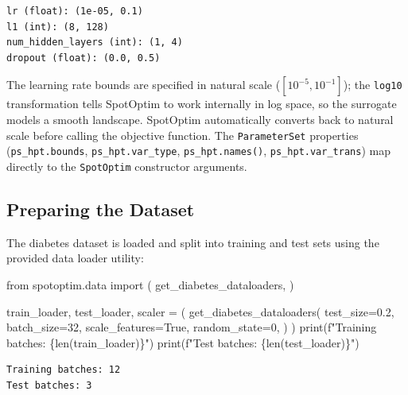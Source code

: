 \documentclass[
  twocolumn]{article}
\newenvironment{Shaded}{\begin{snugshade}}{\end{snugshade}}
\newcommand{\BuiltInTok}[1]{\textcolor[rgb]{0.00,0.23,0.31}{#1}}
\newcommand{\DecValTok}[1]{\textcolor[rgb]{0.68,0.00,0.00}{#1}}
\newcommand{\FloatTok}[1]{\textcolor[rgb]{0.68,0.00,0.00}{#1}}
\newcommand{\ImportTok}[1]{\textcolor[rgb]{0.00,0.46,0.62}{#1}}
\newcommand{\NormalTok}[1]{\textcolor[rgb]{0.00,0.23,0.31}{#1}}
\newcommand{\OperatorTok}[1]{\textcolor[rgb]{0.37,0.37,0.37}{#1}}
\newcommand{\SpecialCharTok}[1]{\textcolor[rgb]{0.37,0.37,0.37}{#1}}
\newcommand{\SpecialStringTok}[1]{\textcolor[rgb]{0.13,0.47,0.30}{#1}}
\newcommand{\VariableTok}[1]{\textcolor[rgb]{0.07,0.07,0.07}{#1}}
\begin{document}
\begin{verbatim}
lr (float): (1e-05, 0.1)
l1 (int): (8, 128)
num_hidden_layers (int): (1, 4)
dropout (float): (0.0, 0.5)
\end{verbatim}

The learning rate bounds are specified in natural scale
(\([10^{-5}, 10^{-1}]\)); the \texttt{log10} transformation tells
SpotOptim to work internally in log space, so the surrogate models a
smooth landscape. SpotOptim automatically converts back to natural scale
before calling the objective function. The \texttt{ParameterSet}
properties (\texttt{ps\_hpt.bounds}, \texttt{ps\_hpt.var\_type},
\texttt{ps\_hpt.names()}, \texttt{ps\_hpt.var\_trans}) map directly to
the \texttt{SpotOptim} constructor arguments.

\subsection{Preparing the Dataset}\label{preparing-the-dataset}

The diabetes dataset is loaded and split into training and test sets
using the provided data loader utility:

\begin{Shaded}
\begin{Highlighting}[]
\ImportTok{from}\NormalTok{ spotoptim.data }\ImportTok{import}\NormalTok{ (}
\NormalTok{    get\_diabetes\_dataloaders,}
\NormalTok{)}

\NormalTok{train\_loader, test\_loader, scaler }\OperatorTok{=}\NormalTok{ (}
\NormalTok{    get\_diabetes\_dataloaders(}
\NormalTok{        test\_size}\OperatorTok{=}\FloatTok{0.2}\NormalTok{,}
\NormalTok{        batch\_size}\OperatorTok{=}\DecValTok{32}\NormalTok{,}
\NormalTok{        scale\_features}\OperatorTok{=}\VariableTok{True}\NormalTok{,}
\NormalTok{        random\_state}\OperatorTok{=}\DecValTok{0}\NormalTok{,}
\NormalTok{    )}
\NormalTok{)}
\BuiltInTok{print}\NormalTok{(}\SpecialStringTok{f"Training batches: }\SpecialCharTok{\{}\BuiltInTok{len}\NormalTok{(train\_loader)}\SpecialCharTok{\}}\SpecialStringTok{"}\NormalTok{)}
\BuiltInTok{print}\NormalTok{(}\SpecialStringTok{f"Test batches: }\SpecialCharTok{\{}\BuiltInTok{len}\NormalTok{(test\_loader)}\SpecialCharTok{\}}\SpecialStringTok{"}\NormalTok{)}
\end{Highlighting}
\end{Shaded}

\begin{verbatim}
Training batches: 12
Test batches: 3
\end{verbatim}
\end{document}
